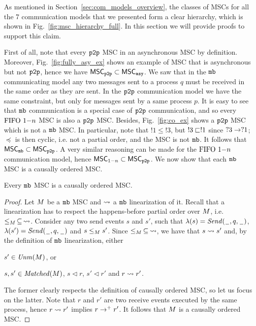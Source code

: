 
As mentioned in Section~\ref{sec:com_models_overview}, the classes of MSCs for all the 7 communication models that we presented form a clear hierarchy, which is shown in Fig.~\ref{fig:msc_hierarchy_full}. In this section we will provide proofs to support this claim. 

\medskip

First of all, note that every $\mathtt{p2p}$ MSC in an asynchronous MSC by definition. Moreover, Fig.~\ref{fig:fully_asy_ex} shows an example of MSC that is asynchronous but not $\mathtt{p2p}$, hence we have $\mathsf{MSC}_{\mathtt{p2p}} \subset \mathsf{MSC}_{\mathtt{asy}}$. We saw that in the $\mathtt{mb}$ communicating model any two messages sent to a process $q$ must be received in the same order as they are sent. In the $\mathtt{p2p}$ communication model we have the same constraint, but only for messages sent by a same process $p$. It is easy to see that $\mathtt{mb}$ communication is a special case of $\mathtt{p2p}$ communication, and so every $\text{FIFO } 1\mathsf{-}n$ MSC is also a $\mathtt{p2p}$ MSC. Besides, Fig.~\ref{fig:co_ex} shows a $\mathtt{p2p}$ MSC which is not a $\mathtt{mb}$ MSC. In particular, note that $!1 \le !3$, but $!3 \sqsubset !1$ since $?3 \to ?1$; $\preceq$ is then cyclic, i.e. not a partial order, and the MSC is not $\mathtt{mb}$. It follows that $\mathsf{MSC}_{\mathtt{mb}} \subset \mathsf{MSC}_{\mathtt{p2p}}$. A very similar reasoning can be made for the $\text{FIFO } 1\mathsf{-}n$ communication model, hence $\mathsf{MSC}_{1\mathsf{-}n} \subset \mathsf{MSC}_{\mathtt{p2p}}$. We now show that each $\mathtt{mb}$ MSC is a causally ordered MSC.

\begin{proposition} \label{prop:mb_is_co}
	Every $\mathtt{mb}$ MSC is a causally ordered MSC.
\end{proposition}
\begin{proof}
Let $M$ be a $\mathtt{mb}$ MSC and $\rightsquigarrow$ a $\mathtt{mb}$ linearization of it. Recall that a linearization has to respect the happens-before partial order over $M$, i.e. $\le_M \,\subseteq\, \rightsquigarrow$. Consider any two send events $s$ and $s'$, such that $\lambda(s)={\mathit{Send}(\hspace{0.1em}\underline{\hspace{0.5em}}\hspace{0.1em},q,\hspace{0.1em}\underline{\hspace{0.5em}}\hspace{0.1em})}$, $\lambda(s')={\mathit{Send}(\hspace{0.1em}\underline{\hspace{0.5em}}\hspace{0.1em},q,\hspace{0.1em}\underline{\hspace{0.5em}}\hspace{0.1em})}$ and $s \le_M s'$. Since $\le_M \,\subseteq\, \rightsquigarrow$, we have that $s \rightsquigarrow s'$ and, by the definition of $\mathtt{mb}$ linearization, either
\begin{enumerate*}[label={(\roman*)}]
	\item $s' \in \mathit{Unm}(M)$, or 
	\item $s,s' \in \mathit{Matched}(M)$, $s \lhd r$, $s' \lhd r'$ and $r \rightsquigarrow r'$. 
\end{enumerate*}
The former clearly respects the definition of causally ordered MSC, so let us focus on the latter. Note that $r$ and $r'$ are two receive events executed by the same process, hence $r \rightsquigarrow r'$ implies $r \to^+ r'$. It follows that $M$ is a causally ordered MSC.
\end{proof}

